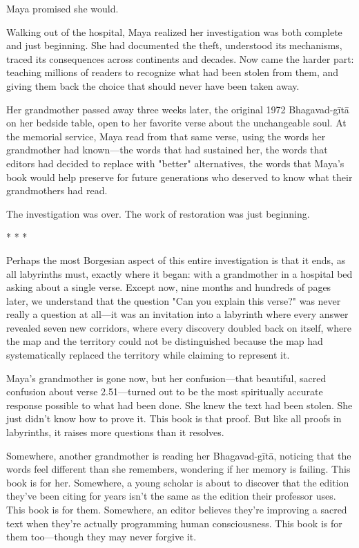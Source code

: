 \documentclass[12pt,twoside]{book}
\begin{document}
Maya promised she would.

Walking out of the hospital, Maya realized her investigation was both complete and just beginning. She had documented the theft, understood its mechanisms, traced its consequences across continents and decades. Now came the harder part: teaching millions of readers to recognize what had been stolen from them, and giving them back the choice that should never have been taken away.

Her grandmother passed away three weeks later, the original 1972 Bhagavad-gītā on her bedside table, open to her favorite verse about the unchangeable soul. At the memorial service, Maya read from that same verse, using the words her grandmother had known—the words that had sustained her, the words that editors had decided to replace with "better" alternatives, the words that Maya's book would help preserve for future generations who deserved to know what their grandmothers had read.

The investigation was over. The work of restoration was just beginning.

\begin{center}
* * *
\end{center}

Perhaps the most Borgesian aspect of this entire investigation is that it ends, as all labyrinths must, exactly where it began: with a grandmother in a hospital bed asking about a single verse. Except now, nine months and hundreds of pages later, we understand that the question "Can you explain this verse?" was never really a question at all—it was an invitation into a labyrinth where every answer revealed seven new corridors, where every discovery doubled back on itself, where the map and the territory could not be distinguished because the map had systematically replaced the territory while claiming to represent it.

Maya's grandmother is gone now, but her confusion—that beautiful, sacred confusion about verse 2.51—turned out to be the most spiritually accurate response possible to what had been done. She knew the text had been stolen. She just didn't know how to prove it. This book is that proof. But like all proofs in labyrinths, it raises more questions than it resolves.

Somewhere, another grandmother is reading her Bhagavad-gītā, noticing that the words feel different than she remembers, wondering if her memory is failing. This book is for her. Somewhere, a young scholar is about to discover that the edition they've been citing for years isn't the same as the edition their professor uses. This book is for them. Somewhere, an editor believes they're improving a sacred text when they're actually programming human consciousness. This book is for them too—though they may never forgive it.
\end{document}
